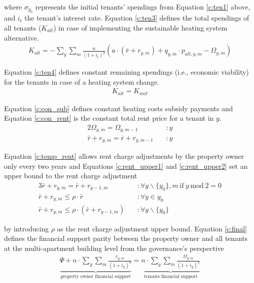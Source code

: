 where $\sigma_{y_0}$ represents the initial tenants' spendings from Equation \ref{c:ten1} above, and $i_t$ the tenant's interest rate. Equation \ref{c:ten3} defines the total spendings of all tenants ($K_{alt}$) in case of implementing the sustainable heating system alternative.
\begin{align}\label{c:ten3}
	K_{alt} = -\sum_{y} \sum_{m} \frac{n}{(1+i_{t})^y} \left(a \cdot (\bar{r} + r_{y,m}) + q_{y,m} \cdot p_{alt,y,m}-\Omega_{y,m} \right)
\end{align}

Equation \ref{c:ten4} defines constant remaining spendings (i.e., economic viability) for the tenants in case of a heating system change.
\begin{align}\label{c:ten4}
K_{alt} = K_{init}
\end{align}

Equation \ref{c:con_sub} defines constant heating costs subsidy payments and Equation \ref{c:con_rent} is the constant total rent price for a tenant in $y$.
\begin{alignat}{2}
\Omega_{y,m} = \Omega_{y,m-1} \quad &:y\label{c:con_sub}\\
\bar{r} + r_{y,m} = \bar{r} + r_{y,m-1} \quad &:y\label{c:con_rent}
\end{alignat}

Equation \ref{c:temp_rent} allows rent charge adjustments by the property owner only every two years and Equations \ref{c:rent_upper1} and \ref{c:rent_upper2} set an upper bound to the rent charge adjustment
\begin{alignat}{3}
\bar{r} + r_{y,m} = \bar{r} + r_{y-1,m} \quad &:\forall y\backslash \{y_0\},m~\text{if}~y~\text{mod}~2=0\label{c:temp_rent}\\
\bar{r}+r_{y,m} \leq \rho \cdot \bar{r} \quad &:\forall y \in {y_0}\label{c:rent_upper1}\\
\bar{r}+r_{y,m} \leq \rho \cdot \left(\bar{r}+r_{y-1,m}\right) \quad &:\forall y\backslash \{y_0\}\label{c:rent_upper2}
\end{alignat}

by introducing $\rho$ as the rent charge adjustment upper bound. Equation \ref{c:final} defines the financial support parity between the property owner and all tenants at the multi-apartment building level from the governance's perspective 
\begin{align}\label{c:final}
\underbrace{\Psi +  n \cdot \sum_{y} \sum_{m} \frac{r_{y,m}}{(1+i_{g})^y}}_{\text{property owner financial support}}= \underbrace{n \cdot \sum_{y} \sum_{m} \frac{\Omega_{y,m}}{(1+i_{g})^y}}_{\text{tenants financial support}}
\end{align}

